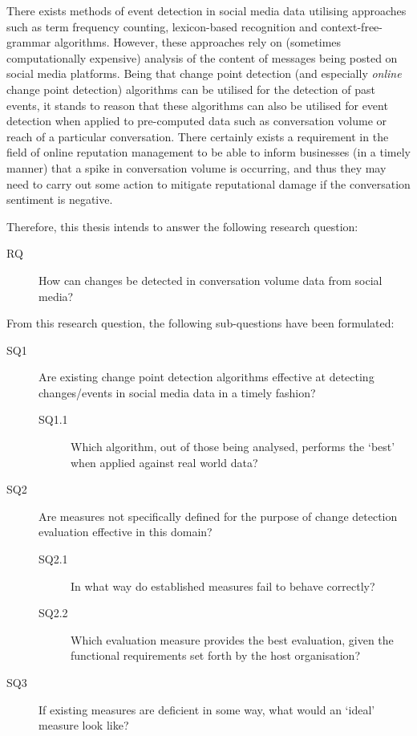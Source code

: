 \documentclass[../main.tex]{subfiles}
\begin{document}
There exists methods of event detection in social media data utilising approaches such as term frequency counting, lexicon-based recognition and context-free-grammar algorithms. However, these approaches rely on (sometimes computationally expensive) analysis of the content of messages being posted on social media platforms. Being that change point detection (and especially \emph{online} change point detection) algorithms can be utilised for the detection of past events, it stands to reason that these algorithms can also be utilised for event detection when applied to pre-computed data such as conversation volume or reach of a particular conversation. There certainly exists a requirement in the field of online reputation management to be able to inform businesses (in a timely manner) that a spike in conversation volume is occurring, and thus they may need to carry out some action to mitigate reputational damage if the conversation sentiment is negative.

Therefore, this thesis intends to answer the following research question:

\begin{description}
    \item[RQ] How can changes be detected in conversation volume data from social media?
\end{description}

From this research question, the following sub-questions have been formulated:

\begin{description}
	\item[SQ1] Are existing change point detection algorithms effective at detecting changes/events in social media data in a timely fashion?
	\begin{description}
	\item[SQ1.1] Which algorithm, out of those being analysed, performs the `best' when applied against real world data?
	\end{description}
	\item[SQ2] Are measures not specifically defined for the purpose of change detection evaluation effective in this domain?
	\begin{description}
	\item[SQ2.1] In what way do established measures fail to behave correctly?
    \item[SQ2.2] Which evaluation measure provides the best evaluation, given the functional requirements set forth by the host organisation?
    \end{description}
	\item[SQ3] If existing measures are deficient in some way, what would an `ideal' measure look like?
\end{description}
\end{document}
